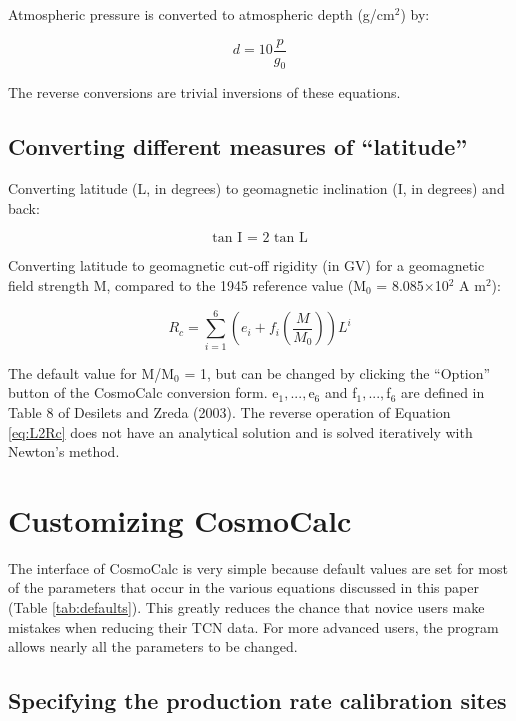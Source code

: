 \documentclass{article}
\begin{document}
Atmospheric pressure is converted to atmospheric depth (g/cm$^2$) by:

\begin{equation}
  \label{eq:p2d}
  d = 10 \frac{p}{g_0}
\end{equation}

The reverse conversions are trivial inversions of these equations.

\subsection{Converting different measures of ``latitude''}\label{sec:latitude}

Converting latitude (L, in  degrees) to geomagnetic inclination (I, in
degrees) and back:

\begin{equation}
  \label{eq:l2i}
\mbox{tan I = 2 tan L}
\end{equation}

Converting  latitude to  geomagnetic cut-off  rigidity (in  GV)  for a
geomagnetic  field strength M,  compared to  the 1945  reference value
(M$_0$ = 8.085$\times$10$^2$ A m$^2$):

\begin{equation}
  \label{eq:L2Rc}
  R_c = \sum_{i=1}^{6}\left(e_i + f_i\left(\frac{M}{M_0}\right)\right) L^i
\end{equation}

The default value for M/M$_0$ =  1, but can be changed by clicking the
``Option'' button  of the CosmoCalc  conversion form.  e$_1,...,$e$_6$
and  f$_1,...,$f$_6$ are  defined in  Table  8 of  Desilets and  Zreda
(2003). The reverse operation  of Equation \ref{eq:L2Rc} does not have
an analytical solution and is solved iteratively with Newton's method.

\section{Customizing CosmoCalc}\label{sec:settings}

The interface of  CosmoCalc is very simple because  default values are
set for  most of  the parameters that  occur in the  various equations
discussed  in  this paper  (Table  \ref{tab:defaults}).  This  greatly
reduces the chance that novice users make mistakes when reducing their
TCN data. For  more advanced users, the program  allows nearly all the
parameters to be changed.

\subsection{Specifying the production rate calibration sites} 
\label{sec:calibration}
\end{document}
